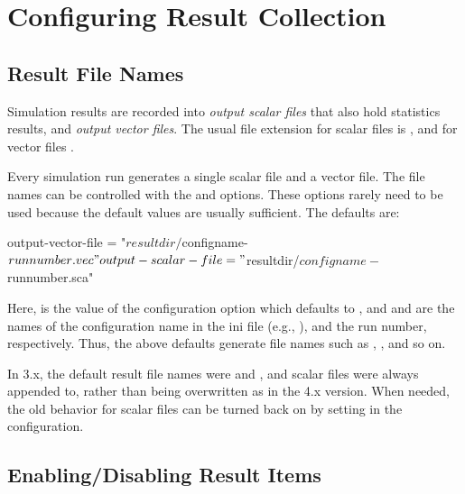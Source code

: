 \section{Configuring Result Collection}
\label{sec:ana-sim:config-results}

\subsection{Result File Names}
\label{sec:ana-sim:result-file-names}

Simulation results are recorded into \textit{output scalar files} that also hold
statistics results, and \textit{output vector files}. The usual file extension
for scalar files is , and for vector files .

Every simulation run generates a single scalar file and a vector file. The file
names can be controlled with the  and
 options. These options rarely need to be used
because the default values are usually sufficient. The defaults are:

\begin{inifile}
output-vector-file = "${resultdir}/${configname}-${runnumber}.vec"
output-scalar-file = "${resultdir}/${configname}-${runnumber}.sca"
\end{inifile}

Here,  is the value of the 
configuration option which defaults to , and
 and  are the names of the
configuration name in the ini file (e.g., ), and the run
number, respectively. Thus, the above defaults generate file names such as
, , and so on.

\begin{note}
  In {\opp} 3.x, the default result file names were  and
  , and scalar files were always appended to, rather than
  being overwritten as in the 4.x version. When needed, the old behavior
  for scalar files can be turned back on by setting
   in the configuration.
\end{note}


\subsection{Enabling/Disabling Result Items}
\label{sec:ana-sim:disabling-result-items}

